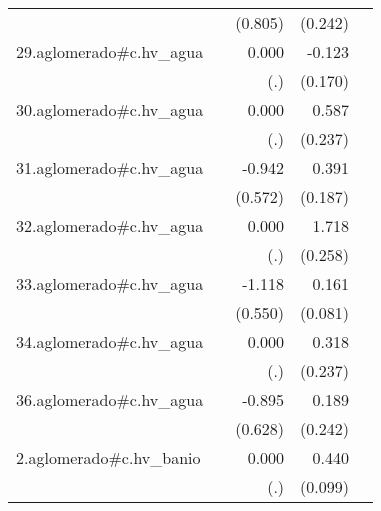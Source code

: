 {\begin{longtable}{l*{4}{D{.}{.}{-1}}}
            &                     &     (0.805)         &     (0.242)         &                     \\
\addlinespace
29.aglomerado#c.hv\_agua&                     &       0.000         &      -0.123         &                     \\
            &                     &         (.)         &     (0.170)         &                     \\
\addlinespace
30.aglomerado#c.hv\_agua&                     &       0.000         &       0.587\sym{*}  &                     \\
            &                     &         (.)         &     (0.237)         &                     \\
\addlinespace
31.aglomerado#c.hv\_agua&                     &      -0.942         &       0.391\sym{*}  &                     \\
            &                     &     (0.572)         &     (0.187)         &                     \\
\addlinespace
32.aglomerado#c.hv\_agua&                     &       0.000         &       1.718\sym{***}&                     \\
            &                     &         (.)         &     (0.258)         &                     \\
\addlinespace
33.aglomerado#c.hv\_agua&                     &      -1.118\sym{*}  &       0.161\sym{*}  &                     \\
            &                     &     (0.550)         &     (0.081)         &                     \\
\addlinespace
34.aglomerado#c.hv\_agua&                     &       0.000         &       0.318         &                     \\
            &                     &         (.)         &     (0.237)         &                     \\
\addlinespace
36.aglomerado#c.hv\_agua&                     &      -0.895         &       0.189         &                     \\
            &                     &     (0.628)         &     (0.242)         &                     \\
\addlinespace
2.aglomerado#c.hv\_banio&                     &       0.000         &       0.440\sym{***}&                     \\
            &                     &         (.)         &     (0.099)         &                     \\

\end{longtable}}
